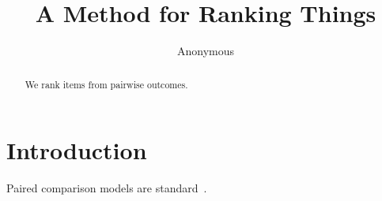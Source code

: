 \documentclass[runningheads]{llncs}
\begin{document}
\title{A Method for Ranking Things}
\author{Anonymous}
\maketitle

\begin{abstract}
We rank items from pairwise outcomes.
\end{abstract}

\section{Introduction}
Paired comparison models are standard~\cite{Bradley1952}.



\end{document}
